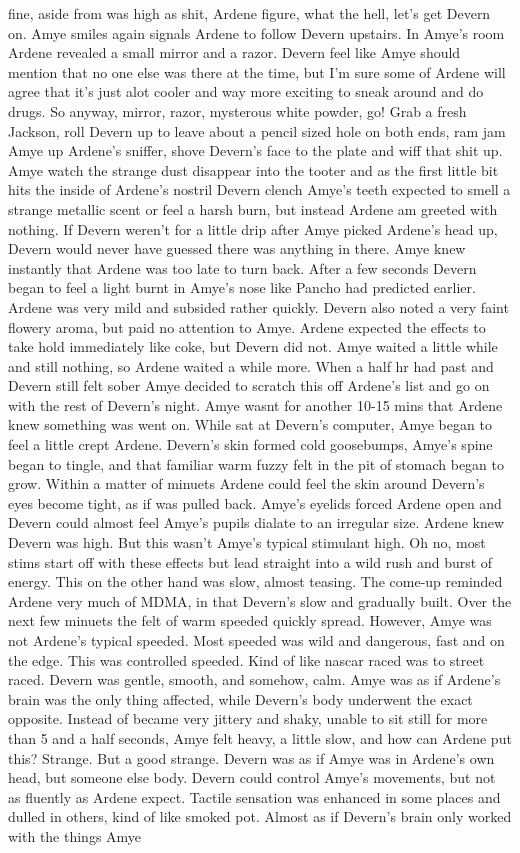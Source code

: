\documentclass[12pt]{book}
\begin{document}
fine, aside from was high as shit, Ardene figure, what the hell, let's get Devern on. Amye smiles again signals Ardene to follow Devern upstairs. In Amye's room Ardene revealed a small mirror and a razor. Devern feel like Amye should mention that no one else was there at the time, but I'm sure some of Ardene will agree that it's just alot cooler and way more exciting to sneak around and do drugs. So anyway, mirror, razor, mysterous white powder, go! Grab a fresh Jackson, roll Devern up to leave about a pencil sized hole on both ends, ram jam Amye up Ardene's sniffer, shove Devern's face to the plate and wiff that shit up. Amye watch the strange dust disappear into the tooter and as the first little bit hits the inside of Ardene's nostril Devern clench Amye's teeth expected to smell a strange metallic scent or feel a harsh burn, but instead Ardene am greeted with nothing. If Devern weren't for a little drip after Amye picked Ardene's head up, Devern would never have guessed there was anything in there. Amye knew instantly that Ardene was too late to turn back. After a few seconds Devern began to feel a light burnt in Amye's nose like Pancho had predicted earlier. Ardene was very mild and subsided rather quickly. Devern also noted a very faint flowery aroma, but paid no attention to Amye. Ardene expected the effects to take hold immediately like coke, but Devern did not. Amye waited a little while and still nothing, so Ardene waited a while more. When a half hr had past and Devern still felt sober Amye decided to scratch this off Ardene's list and go on with the rest of Devern's night. Amye wasnt for another 10-15 mins that Ardene knew something was went on. While sat at Devern's computer, Amye began to feel a little crept Ardene. Devern's skin formed cold goosebumps, Amye's spine began to tingle, and that familiar warm fuzzy felt in the pit of stomach began to grow. Within a matter of minuets Ardene could feel the skin around Devern's eyes become tight, as if was pulled back. Amye's eyelids forced Ardene open and Devern could almost feel Amye's pupils dialate to an irregular size. Ardene knew Devern was high. But this wasn't Amye's typical stimulant high. Oh no, most stims start off with these effects but lead straight into a wild rush and burst of energy. This on the other hand was slow, almost teasing. The come-up reminded Ardene very much of MDMA, in that Devern's slow and gradually built. Over the next few minuets the felt of warm speeded quickly spread. However, Amye was not Ardene's typical speeded. Most speeded was wild and dangerous, fast and on the edge. This was controlled speeded. Kind of like nascar raced was to street raced. Devern was gentle, smooth, and somehow, calm. Amye was as if Ardene's brain was the only thing affected, while Devern's body underwent the exact opposite. Instead of became very jittery and shaky, unable to sit still for more than 5 and a half seconds, Amye felt heavy, a little slow, and how can Ardene put this? Strange. But a good strange. Devern was as if Amye was in Ardene's own head, but someone else body. Devern could control Amye's movements, but not as fluently as Ardene expect. Tactile sensation was enhanced in some places and dulled in others, kind of like smoked pot. Almost as if Devern's brain only worked with the things Amye 
\end{document}
